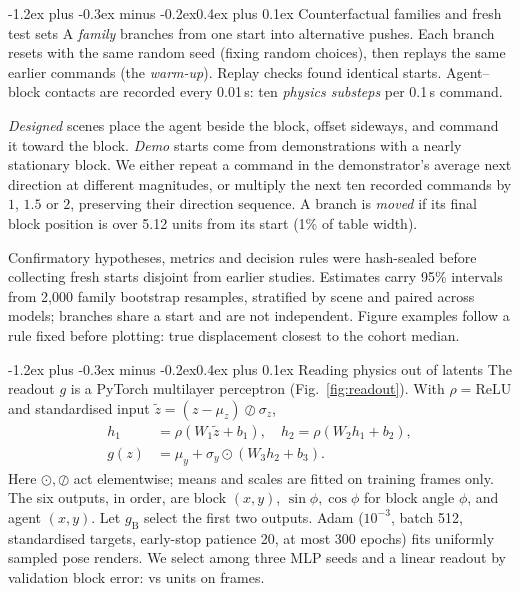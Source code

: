 \documentclass[10pt,twocolumn,a4paper]{article}
\makeatletter
\renewcommand\subsection{\@startsection{subsection}{2}{\z@}%
  {-1.2ex plus -0.3ex minus -0.2ex}{0.4ex plus 0.1ex}%
  {\normalfont\normalsize\bfseries\color{accent}}}
\makeatother
\begin{document}
\subsection{Counterfactual families and fresh test sets}\label{sec:families}
A \emph{family} branches from one start into alternative pushes. Each branch resets
with the same random seed (fixing random choices), then replays the same earlier
commands (the \emph{warm-up}). Replay checks found identical starts. Agent--block
contacts are recorded every 0.01\,s: ten \emph{physics substeps} per 0.1\,s command.

\emph{Designed} scenes place the agent beside the block, offset sideways, and command
it toward the block. \emph{Demo} starts come from demonstrations with a nearly stationary
block. We either repeat a command in the demonstrator's average next direction at
different magnitudes, or multiply the next ten recorded commands by $1$, $1.5$ or $2$,
preserving their direction sequence. A branch is \emph{moved} if its final block
position is over 5.12 units from its start (1\% of table width).

Confirmatory hypotheses, metrics and decision rules were hash-sealed before collecting
fresh starts disjoint from earlier studies. Estimates carry 95\% intervals from 2,000
family bootstrap resamples, stratified by scene and paired across models; branches
share a start and are not independent. Figure examples follow a rule fixed before
plotting: true displacement closest to the cohort median.

\subsection{Reading physics out of latents}\label{sec:readout}
The readout $g$ is a PyTorch multilayer perceptron (Fig.~\ref{fig:readout}). With
$\rho=\mathrm{ReLU}$ and standardised input $\tilde z=(z-\mu_z)\oslash\sigma_z$,
\begin{equation}\label{eq:readout}
\begin{aligned}
h_1&=\rho(W_1\tilde z+b_1),\quad h_2=\rho(W_2h_1+b_2),\\
g(z)&=\mu_y+\sigma_y\odot(W_3h_2+b_3).
\end{aligned}
\end{equation}
Here $\odot,\oslash$ act elementwise; means and scales are fitted on training frames
only. The six outputs, in order, are block $(x,y)$, $\sin\phi,\cos\phi$ for block angle
$\phi$, and agent $(x,y)$. Let $g_{\mathrm{B}}$ select the first two outputs.
Adam ($10^{-3}$, batch 512, standardised targets, early-stop patience 20, at most 300 epochs)
fits \readoutTrainFrames{} uniformly sampled pose renders. We select among three MLP
seeds and a linear readout by validation block error: \readoutBlockError{} vs
\readoutRidgeError{} units on \readoutValFrames{} frames.
\end{document}
